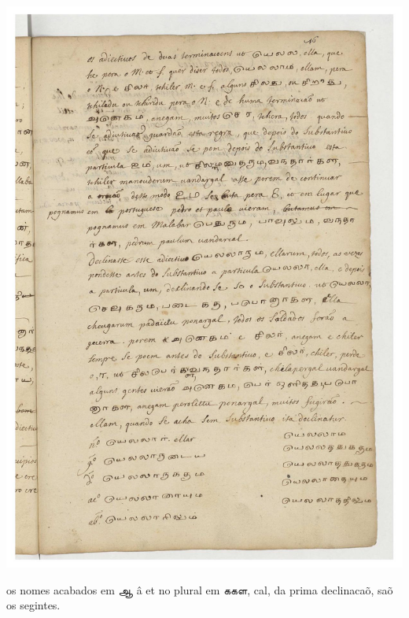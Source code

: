 \documentclass[12pt,a4paper]{scrbook}
\begin{document}
      
\newpage
\hypertarget{img-41}{
    \includegraphics[width=\textwidth]{img-41}}
\newpage
      

os nomes acabados em ஆ â et no plural em ககள, cal, da prima declinacaõ, saõ os 
             segintes.
        
\end{document}
